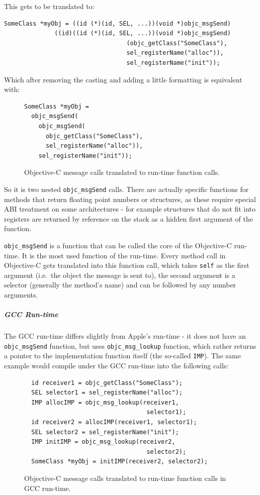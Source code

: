 This gets to be translated to:
\begin{verbatim}SomeClass *myObj = ((id (*)(id, SEL, ...))(void *)objc_msgSend)
              ((id)((id (*)(id, SEL, ...))(void *)objc_msgSend)
                                  (objc_getClass("SomeClass"),
                                  sel_registerName("alloc")), 
                                  sel_registerName("init"));
\end{verbatim}

Which after removing the casting and adding a little formatting is equivalent with:

\begin{figure}[H]
  \begin{verbatim}SomeClass *myObj = 
  objc_msgSend(
    objc_msgSend(
      objc_getClass("SomeClass"),  
      sel_registerName("alloc")), 
    sel_registerName("init"));
  \end{verbatim}
  \centering{}
  \caption{Objective-C message calls translated to run-time function calls.}
  \label{fig:methods_translated_to_objcMsgSend}
\end{figure}

So it is two nested \verb=objc_msgSend= calls. There are actually specific functions for methods that return floating point numbers or structures, as these require special ABI treatment on some architectures - for example structures that do not fit into registers are returned by reference on the stack as a hidden first argument of the function.

\verb=objc_msgSend= is a function that can be called the core of the Objective-C run-time. It is the most used function of the run-time. Every method call in Objective-C gets translated into this function call, which takes \verb=self= as the first argument (i.e.\ the object the message is sent to), the second argument is a selector (generally the method's name) and can be followed by any number arguments.

\subparagraph{GCC Run-time}

The GCC run-time differs slightly from Apple's run-time - it does not have an \verb=objc_msgSend= function, but uses \verb=objc_msg_lookup= function, which rather returns a pointer to the implementation function itself (the so-called \verb=IMP=). The same example would compile under the GCC run-time into the following calls:

\begin{figure}[H]
\begin{verbatim}
  id receiver1 = objc_getClass("SomeClass");
  SEL selector1 = sel_registerName("alloc");
  IMP allocIMP = objc_msg_lookup(receiver1, 
                                  selector1);
  id receiver2 = allocIMP(receiver1, selector1);
  SEL selector2 = sel_registerName("init");
  IMP initIMP = objc_msg_lookup(receiver2, 
                                  selector2);
  SomeClass *myObj = initIMP(receiver2, selector2);
\end{verbatim}
\centering{}
  \caption{Objective-C message calls translated to run-time function calls in GCC run-time.}
  \label{fig:methods_translated_to_objc_msg_lookup}
\end{figure}

